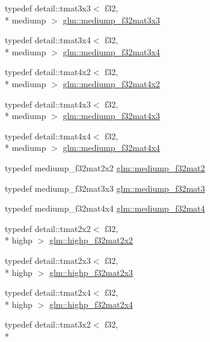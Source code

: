 \begin{DoxyCompactItemize}
\item 
typedef detail\-::tmat3x3$<$ f32, \\*
mediump $>$ \hyperlink{group__gtc__type__precision_gad4d01189a1462366b143c5cbc3de0ea9}{glm\-::mediump\-\_\-f32mat3x3}
\item 
typedef detail\-::tmat3x4$<$ f32, \\*
mediump $>$ \hyperlink{group__gtc__type__precision_ga7ad59b967576d930f4c8aa7b8c48e1af}{glm\-::mediump\-\_\-f32mat3x4}
\item 
typedef detail\-::tmat4x2$<$ f32, \\*
mediump $>$ \hyperlink{group__gtc__type__precision_ga3400d5463f0a58cf3959406aa2b69f72}{glm\-::mediump\-\_\-f32mat4x2}
\item 
typedef detail\-::tmat4x3$<$ f32, \\*
mediump $>$ \hyperlink{group__gtc__type__precision_ga31635d753ab8a19fdaa80d2b89e90c54}{glm\-::mediump\-\_\-f32mat4x3}
\item 
typedef detail\-::tmat4x4$<$ f32, \\*
mediump $>$ \hyperlink{group__gtc__type__precision_ga8f83086fffe71f9cd15e75a1de101ba6}{glm\-::mediump\-\_\-f32mat4x4}
\item 
typedef mediump\-\_\-f32mat2x2 \hyperlink{group__gtc__type__precision_ga103735a38477f7c389b36aae0fbdf274}{glm\-::mediump\-\_\-f32mat2}
\item 
typedef mediump\-\_\-f32mat3x3 \hyperlink{group__gtc__type__precision_gae263a08ef179894fdd36f9a51698c4ab}{glm\-::mediump\-\_\-f32mat3}
\item 
typedef mediump\-\_\-f32mat4x4 \hyperlink{group__gtc__type__precision_ga56bd98ec31b6abc0315d688d4ecd94a0}{glm\-::mediump\-\_\-f32mat4}
\item 
typedef detail\-::tmat2x2$<$ f32, \\*
highp $>$ \hyperlink{group__gtc__type__precision_gaf3a2cc948ca6fd168391138ce6fdd100}{glm\-::highp\-\_\-f32mat2x2}
\item 
typedef detail\-::tmat2x3$<$ f32, \\*
highp $>$ \hyperlink{group__gtc__type__precision_ga53613c1b93f81207065a8a935ff02a81}{glm\-::highp\-\_\-f32mat2x3}
\item 
typedef detail\-::tmat2x4$<$ f32, \\*
highp $>$ \hyperlink{group__gtc__type__precision_ga9689dbe21bc976ca8069c63300b5887e}{glm\-::highp\-\_\-f32mat2x4}
\item 
typedef detail\-::tmat3x2$<$ f32, \\*

\end{DoxyCompactItemize}
